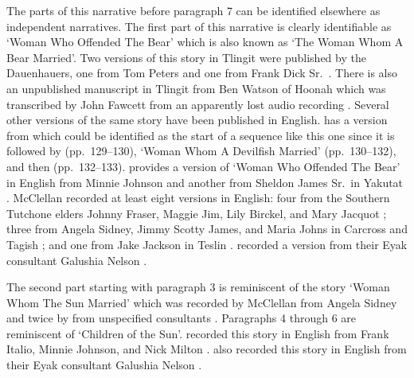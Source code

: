 The parts of this narrative before paragraph 7 can be identified elsewhere as independent narratives.
The first part of this narrative is clearly identifiable as  ‘Woman Who Offended The Bear’ which is also known as  ‘The Woman Whom A Bear Married’.
Two versions of this story in Tlingit were published by the Dauenhauers, one from  Tom Peters \parencite[166–193]{dauenhauer:1987} and one from  Frank Dick Sr.\ \parencite[194–217]{dauenhauer:1987}.
There is also an unpublished manuscript in Tlingit from  Ben Watson of Hoonah which was transcribed by  John Fawcett from an apparently lost audio recording \parencite{fawcett:1973a}.
Several other versions of the same story have been published in English.
\citeauthor{swanton:1909} has a version from  \parencite[126–129]{swanton:1909} which could be identified as the start of a sequence like this one since it is followed by  (pp.\ 129–130),  ‘Woman Whom A Devilfish Married’ (pp.\ 130–132), and then  (pp.\ 132–133).
\citeauthor{de-laguna:1972} provides a version of  ‘Woman Who Offended The Bear’ in English from  Minnie Johnson and another from  Sheldon James Sr.\ in Yakutat \parencite[880–883]{de-laguna:1972}.
McClellan recorded at least eight versions in English: four from the Southern Tutchone elders Johnny Fraser, Maggie Jim, Lily Birckel, and Mary Jacquot \parencite[39–41, 143–146, 163–167, 181–186]{mcclellan-cruikshank:2007a}; three from  Angela Sidney,  Jimmy Scotty James, and  Maria Johns in Carcross and Tagish \parencite[302–308, 435–437, 465–474]{mcclellan-cruikshank:2007b}; and one from  Jake Jackson in Teslin \parencite[498–512]{mcclellan-cruikshank:2007c}.
\citeauthor{birket-smith-de-laguna:1938} recorded a version from their Eyak consultant Galushia Nelson \parencite[277–279]{birket-smith-de-laguna:1938}.

The second part starting with paragraph 3 is reminiscent of the story  ‘Woman Whom The Sun Married’ which was recorded by McClellan from  Angela Sidney \parencite[288–289]{mcclellan-cruikshank:2007a} and twice by \citeauthor{olson:1967} from unspecified consultants \parencite[44, 67 col.\ 2 ¶3]{olson:1967}.
Paragraphs 4 through 6 are reminiscent of  ‘Children of the Sun’.
\citeauthor{de-laguna:1972} recorded this story in English from  Frank Italio,  Minnie Johnson, and  Nick Milton \parencite[873–875]{de-laguna:1972}.
\citeauthor{birket-smith-de-laguna:1938} also recorded this story in English from their Eyak consultant Galushia Nelson \parencite[294–300]{birket-smith-de-laguna:1938}.

